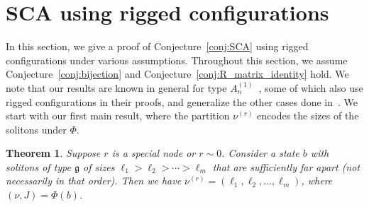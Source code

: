 \documentclass[reqno]{amsart}
\newcommand{\g}{\mathfrak{g}}
\theoremstyle{plain}
\newtheorem{thm}{Theorem}[section]
\theoremstyle{definition}
\numberwithin{equation}{section}
\begin{document}

\section{SCA using rigged configurations}
\label{sec:SCA_RC}

In this section, we give a proof of Conjecture~\ref{conj:SCA} using rigged configurations under various assumptions.
Throughout this section, we assume Conjecture~\ref{conj:bijection} and Conjecture~\ref{conj:R_matrix_identity} hold.
We note that our results are known in general for type $A_n^{(1)}$~\cite{FOY00,HHIKTT01,KOSTY06,Sakamoto08,Sakamoto09,Yamada04}, some of which also use rigged configurations in their proofs, and generalize the other cases done in~\cite{binMohamad12,HKOTY02,HKT00,MOW12,MW13,TNS96,Yamada07}.
We start with our first main result, where the partition $\nu^{(r)}$ encodes the sizes of the solitons under $\Phi$.

\begin{thm}
\label{thm:RC_soliton_sizes}
Suppose $r$ is a special node or $r \sim 0$.
Consider a state $b$ with solitons of type $\g$ of sizes $\ell_1 > \ell_2 > \cdots > \ell_m$ that are sufficiently far apart (not necessarily in that order).
Then we have $\nu^{(r)} = (\ell_1, \ell_2, \dotsc, \ell_m)$, where $(\nu, J) = \Phi(b)$.
\end{thm}
\end{document}
